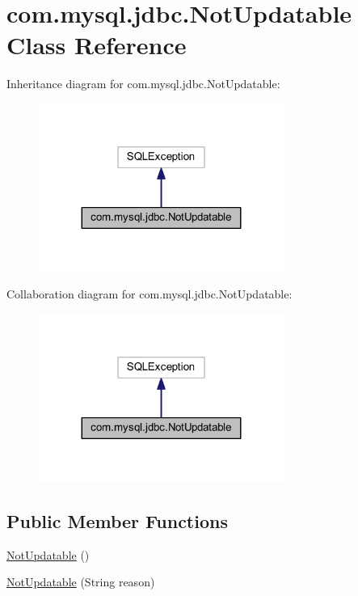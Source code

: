 \hypertarget{classcom_1_1mysql_1_1jdbc_1_1_not_updatable}{}\section{com.\+mysql.\+jdbc.\+Not\+Updatable Class Reference}
\label{classcom_1_1mysql_1_1jdbc_1_1_not_updatable}


Inheritance diagram for com.\+mysql.\+jdbc.\+Not\+Updatable\+:
\nopagebreak
\begin{figure}[H]
\begin{center}
\leavevmode
\includegraphics[width=227pt]{classcom_1_1mysql_1_1jdbc_1_1_not_updatable__inherit__graph}
\end{center}
\end{figure}


Collaboration diagram for com.\+mysql.\+jdbc.\+Not\+Updatable\+:
\nopagebreak
\begin{figure}[H]
\begin{center}
\leavevmode
\includegraphics[width=227pt]{classcom_1_1mysql_1_1jdbc_1_1_not_updatable__coll__graph}
\end{center}
\end{figure}
\subsection*{Public Member Functions}
\begin{DoxyCompactItemize}
\item 
\mbox{\hyperlink{classcom_1_1mysql_1_1jdbc_1_1_not_updatable_a7cf7d4691571ffeb2cff816f8eb450ca}{Not\+Updatable}} ()
\item 
\mbox{\hyperlink{classcom_1_1mysql_1_1jdbc_1_1_not_updatable_a11df678de184699dbb1be7c6cddad461}{Not\+Updatable}} (String reason)
\end{DoxyCompactItemize}
